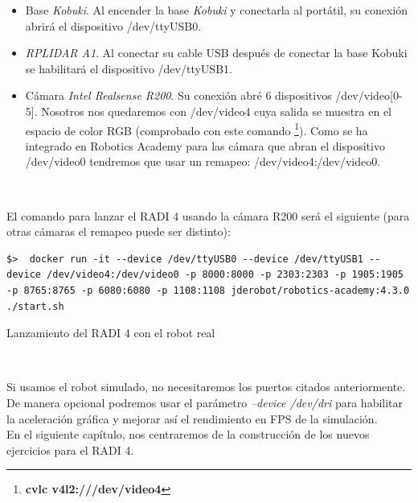 \begin{itemize}
	\item Base \textit{Kobuki}. Al encender la base \textit{Kobuki} y conectarla al portátil, su conexión abrirá el dispositivo /dev/ttyUSB0.
	\item \textit{RPLIDAR A1}. Al conectar su cable USB después de conectar la base Kobuki se habilitará el dispositivo /dev/ttyUSB1.
	\item Cámara \textit{Intel Realsense R200}. Su conexión abré 6 dispositivos /dev/video[0-5]. Nosotros nos quedaremos con /dev/video4 cuya salida se muestra en el espacio de color RGB (comprobado con este comando \footnote{\textbf{cvlc v4l2:///dev/video4}}). Como se ha integrado en Robotics Academy para las cámara que abran el dispositivo /dev/video0 tendremos que usar un remapeo: /dev/video4:/dev/video0.
\end{itemize}\

El comando para lanzar el RADI 4 usando la cámara R200 será el siguiente (para otras cámaras el remapeo puede ser distinto):\\

\begin{code}[H]
\begin{lstlisting}
$>  docker run -it --device /dev/ttyUSB0 --device /dev/ttyUSB1 --device /dev/video4:/dev/video0 -p 8000:8000 -p 2303:2303 -p 1905:1905 -p 8765:8765 -p 6080:6080 -p 1108:1108 jderobot/robotics-academy:4.3.0 ./start.sh
\end{lstlisting}
\caption{Lanzamiento del RADI 4 con el robot real}
\label{cod:lanzamiento_radi_robot_real}
\end{code}\

Si usamos el robot simulado, no necesitaremos los puertos citados anteriormente. De manera opcional podremos usar el parámetro \textit{--device /dev/dri} para habilitar la aceleración gráfica y mejorar así el rendimiento en FPS de la simulación.\\

En el siguiente capítulo, nos centraremos de la construcción de los nuevos ejercicios para el RADI 4.




